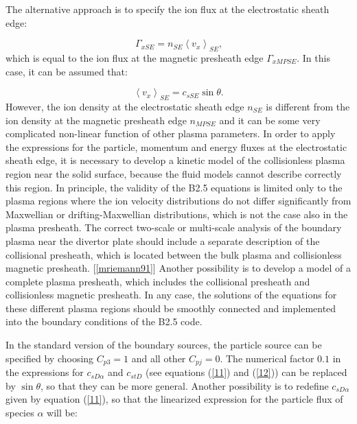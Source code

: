 \documentclass[11pt]{article}
\begin{document}
\bigskip

The alternative approach is to specify the ion flux at the electrostatic
sheath edge:

\begin{equation}
\Gamma_{xSE}=n_{SE}\left\langle v_{x}\right\rangle _{SE}\text{,} 
\label{sheathFlux}
\end{equation}
which is equal to the ion flux at the magnetic presheath edge $\Gamma_{xMPSE}
$. In this case, it can be assumed that:

\begin{equation}
\left\langle v_{x}\right\rangle _{SE}=c_{sSE}\sin\theta\text{.} 
\label{sheathVel}
\end{equation}
However, the ion density at the electrostatic sheath edge $n_{SE}$ is
different from the ion density at the magnetic presheath edge $n_{MPSE}$ and
it can be some very complicated non-linear function of other plasma
parameters. In order to apply the expressions for the particle, momentum and
energy fluxes at the electrostatic sheath edge, it is necessary to develop a
kinetic model of the collisionless plasma region near the solid surface,
because the fluid models cannot describe correctly this region. In
principle, the validity of the B2.5 equations is limited only to the plasma
regions where the ion velocity distributions do not differ significantly
from Maxwellian or drifting-Maxwellian distributions, which is not the case
also in the plasma presheath. The correct two-scale or multi-scale analysis
of the boundary plasma near the divertor plate should include a separate
description of the collisional presheath, which is located between the bulk
plasma and collisionless magnetic presheath. [\ref{mriemann91}] Another
possibility is to develop a model of a complete plasma presheath, which
includes the collisional presheath and collisionless magnetic presheath. In
any case, the solutions of the equations for these different plasma regions
should be smoothly connected and implemented into the boundary conditions of
the B2.5 code.

\bigskip

In the standard version of the boundary sources, the particle source can be
specified by choosing $C_{p3}=1$ and all other $C_{pj}=0$. The numerical
factor $0.1$ in the expressions for $c_{sD\alpha}$ and $c_{stD}$ (see
equations (\ref{11}) and (\ref{12})) can be replaced by $\sin\theta$, so
that they can be more general. Another possibility is to redefine $%
c_{sD\alpha}$ given by equation (\ref{11}), so that the linearized
expression for the particle flux of species $\alpha$ will be:
\end{document}
